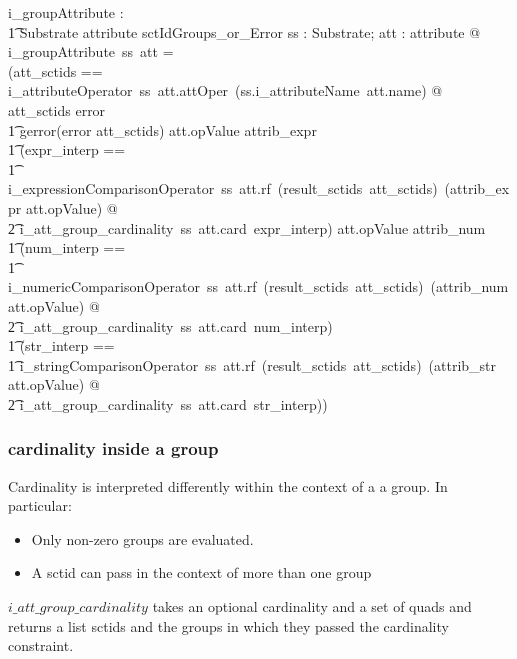 \documentclass{article}
\begin{document}
\begin{gendef}
   i\_groupAttribute : \\
\t1 Substrate  \fun attribute \fun sctIdGroups\_or\_Error 
\where
   \forall ss : Substrate; att : attribute @ \\
   i\_groupAttribute~ss~att = \\
   (\LET att\_sctids == i\_attributeOperator~ss~att.attOper~(ss.i\_attributeName~att.name) @ \\
   \IF att\_sctids \in \ran error \\
\t1 \THEN gerror(error \inv att\_sctids)
\also
   \ELSE \IF att.opValue \in \ran attrib\_expr \THEN \\
\t1 (\LET expr\_interp == \\
\t1 i\_expressionComparisonOperator~ss~att.rf~(result\_sctids~att\_sctids)~(attrib\_expr \inv att.opValue)  @ \\
\t2 i\_att\_group\_cardinality~ss~att.card~expr\_interp)
\also
   \ELSE \IF att.opValue \in \ran attrib\_num  \THEN \\
\t1 (\LET num\_interp == \\
\t1 i\_numericComparisonOperator~ss~att.rf~(result\_sctids~att\_sctids)~(attrib\_num \inv att.opValue)  @ \\
\t2 i\_att\_group\_cardinality~ss~att.card~num\_interp)
\also
   \ELSE  \\
\t1 (\LET str\_interp == \\
\t1 i\_stringComparisonOperator~ss~att.rf~(result\_sctids~att\_sctids)~(attrib\_str \inv att.opValue)  @ \\
\t2 i\_att\_group\_cardinality~ss~att.card~str\_interp))
\end{gendef}

\subsubsection{cardinality inside a group}

Cardinality is interpreted differently within the context of a a group.  In particular:
\begin{itemize}[noitemsep]
\item Only non-zero groups are evaluated. 
\item A sctid can pass in the context of more than one group
\end{itemize}

$i\_att\_group\_cardinality$ takes an optional cardinality and a set of quads and returns a list sctids and the groups in which they passed the cardinality constraint.
\end{document}
